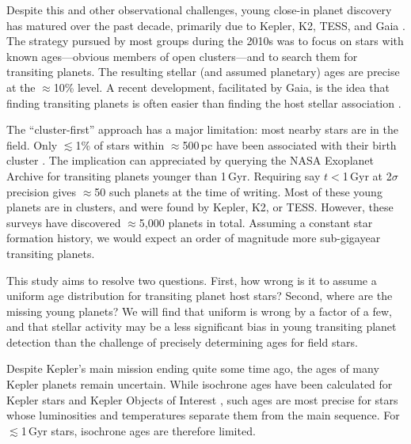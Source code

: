 \documentclass[11pt,twocolumn,tighten]{aastex63}
\begin{document}
Despite this and other observational challenges, young close-in planet
discovery has matured over the past decade, primarily due to Kepler,
K2, TESS, and Gaia
\citep[e.g.][]{Meibom_2013,Mann_K2_25_2016,Curtis_2018,Livingston_2018,David_2019,Bouma_2020_toi837,Rizzuto_2020,Plavchan_2020,Newton_2021,Nardiello_2022,Barber_2022,Zhou_2022,Zakhozhay_2022,Wood_2023}.
The strategy pursued by most groups during the 2010s was to focus on
stars with known ages---obvious members of open clusters---and to
search them for transiting planets.  The resulting stellar (and
assumed planetary) ages are precise at the $\approx$10\% level.  A
recent development, facilitated by Gaia, is the idea that finding
transiting planets is often easier than finding the host stellar
association \citep[e.g.][]{Tofflemire_2021}.

The ``cluster-first'' approach has a major limitation: most nearby
stars are in the field.  Only $\lesssim$1\% of stars
within $\approx$500\,pc have been associated with their birth cluster
\citep[e.g.][]{Zari_2018,CantatGaudin_2020,Kounkel_2020,Kerr_2021}.
The implication can appreciated by querying the NASA Exoplanet Archive
\citep[NEA;][]{2013PASP..125..989A} for transiting planets younger
than 1\,Gyr.  Requiring say $t$$<$1\,Gyr at
2$\sigma$ precision gives $\approx$50 such planets at
the time of writing.  Most of these young planets are in clusters, and
were found by Kepler, K2, or TESS.  However, these surveys have
discovered $\approx$5{,}000 planets in total.  Assuming a constant
star formation history, we would expect an order of magnitude more
sub-gigayear transiting planets.

This study aims to resolve two questions.  First, how wrong is it
to assume a uniform age distribution for transiting planet host stars?
Second, where are the missing young planets?  We will find that
uniform is wrong by a factor of a few, and that stellar activity may
be a less significant bias in young transiting planet detection than
the challenge of precisely determining ages for field stars.

Despite Kepler's main mission ending quite some time ago, the ages of
many Kepler planets remain uncertain.  While isochrone ages have been
calculated for Kepler stars \citep{Berger_2020b_rpage} and Kepler
Objects of Interest \citep[KOIs;][]{Petigura_2022}, such ages are
most precise for stars whose luminosities and temperatures separate
them from the main sequence.  For $\lesssim$1\,Gyr stars, isochrone
ages are therefore limited.
\end{document}
